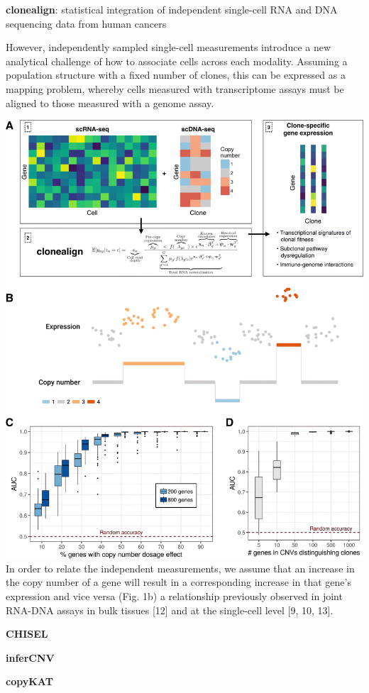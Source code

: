 \documentclass[
]{book}
\begin{document}
\textbf{clonealign}: statistical integration of independent single-cell RNA and DNA sequencing data from human cancers

However, independently sampled single-cell measurements introduce a new analytical challenge of how to associate cells across each modality. Assuming a population structure with a fixed number of clones, this can be expressed as a mapping problem, whereby cells measured with transcriptome assays must be aligned to those measured with a genome assay.

\includegraphics{./figs/CNV/clonealign.jpg}
In order to relate the independent measurements, we assume that an increase in the copy number of a gene will result in a corresponding increase in that gene's expression and vice versa (Fig. 1b)
a relationship previously observed in joint RNA-DNA assays in bulk tissues {[}12{]} and at the single-cell level {[}9, 10, 13{]}.

\textbf{CHISEL}

\textbf{inferCNV}

\textbf{copyKAT}
\end{document}
